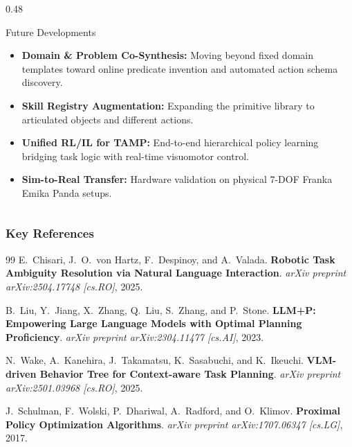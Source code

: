 \documentclass[10pt]{beamer}
\begin{document}
\begin{frame}[t]
\begin{columns}[T]
        \begin{column}{0.48\textwidth}
            \begin{block}{Future Developments}
                \begin{itemize}\scriptsize
                    \item \textbf{Domain \& Problem Co-Synthesis:} Moving beyond fixed domain templates toward online predicate invention and automated action schema discovery.
                    \item \textbf{Skill Registry Augmentation:} Expanding the primitive library to articulated objects and different actions.
                    \item \textbf{Unified RL/IL for TAMP:} End-to-end hierarchical policy learning bridging task logic with real-time visuomotor control.
                    \item \textbf{Sim-to-Real Transfer:} Hardware validation on physical 7-DOF Franka Emika Panda setups.
                \end{itemize}
            \end{block}
        \end{column}
    \end{columns}
\end{frame}

\begin{frame}[t]
    \frametitle{Key References}
    \footnotesize
    \begin{thebibliography}{99}
        E.~Chisari, J.~O.~von Hartz, F.~Despinoy, and A.~Valada.
        \newblock \textbf{Robotic Task Ambiguity Resolution via Natural Language Interaction}.
        \newblock \textit{arXiv preprint arXiv:2504.17748 [cs.RO]}, 2025.

        \vspace{0.15cm}
        B.~Liu, Y.~Jiang, X.~Zhang, Q.~Liu, S.~Zhang, and P.~Stone.
        \newblock \textbf{LLM+P: Empowering Large Language Models with Optimal Planning Proficiency}.
        \newblock \textit{arXiv preprint arXiv:2304.11477 [cs.AI]}, 2023.

        \vspace{0.15cm}
        N.~Wake, A.~Kanehira, J.~Takamatsu, K.~Sasabuchi, and K.~Ikeuchi.
        \newblock \textbf{VLM-driven Behavior Tree for Context-aware Task Planning}.
        \newblock \textit{arXiv preprint arXiv:2501.03968 [cs.RO]}, 2025.

        \vspace{0.15cm}
        J.~Schulman, F.~Wolski, P.~Dhariwal, A.~Radford, and O.~Klimov.
        \newblock \textbf{Proximal Policy Optimization Algorithms}.
        \newblock \textit{arXiv preprint arXiv:1707.06347 [cs.LG]}, 2017.
    \end{thebibliography}
\end{frame}
\end{document}
